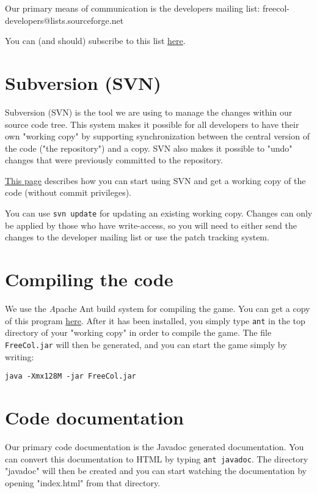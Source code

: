 \documentclass[12pt]{book}
\begin{document}
Our primary means of communication is the developers mailing list:
freecol-developers@lists.sourceforge.net

You can (and should) subscribe to this list 
\href{http://lists.sourceforge.net/lists/listinfo/freecol-developers}{here}.


\hypertarget{Subversion (SVN)}{\section{Subversion (SVN)}}

Subversion (SVN) is the tool we are using to
manage the changes within our source code tree. This system
makes it possible for all developers to have their own
"working copy" by supporting synchronization between the
central version of the code ("the repository") and a copy.
SVN also makes it possible to "undo" changes that were
previously committed to the repository.

\href{http://www.freecol.org/index.php?section=17}{This page}
describes how you can start using SVN and get a working copy of the
code (without commit privileges).

You can use \verb+svn update+ for updating an existing working
copy. Changes can only be applied by those who have write-access, so
you will need to either send the changes to the developer mailing list
or use the patch tracking system.


\hypertarget{Compiling the code}{\section{Compiling the code}}

We use the {\textit Apache Ant} build system for compiling the
game. You can get a copy of this program
\href{http://ant.apache.org}{here}. After it has been installed, you
simply type \verb+ant+ in the top directory of your "working copy" in
order to compile the game.  The file \verb+FreeCol.jar+ will then be
generated, and you can start the game simply by writing:

\verb+java -Xmx128M -jar FreeCol.jar+



\hypertarget{Code documentation}{\section{Code documentation}}

Our primary code documentation is the Javadoc generated
documentation. You can convert this documentation to HTML by
typing \verb+ant javadoc+. The directory "javadoc" will then be
created and you can start watching the documentation by opening
"index.html" from that directory.
\end{document}
